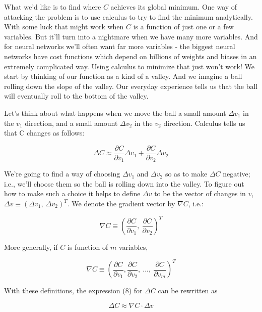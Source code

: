 \documentclass[12 pt]{article}
\begin{document}
What we'd like is to find where $ C $ achieves its global minimum. One
way of attacking the problem is to use calculus to try to find the
minimum analytically. With some luck that might work when $ C $ is a
function of just one or a few variables. But it'll turn into a nightmare
when we have many more variables. And for neural networks we'll often
want far more variables - the biggest neural networks have cost
functions which depend on billions of weights and biases in an extremely
complicated way. Using calculus to minimize that just won't work! We
start by thinking of our function as a kind of a valley. And we imagine
a ball rolling down the slope of the valley. Our everyday experience
tells us that the ball will eventually roll to the bottom of the valley.

Let's think about what happens when we move the ball a small amount
$ \Delta v_1 $ in the $ v_1 $ direction, and a small amount
$ \Delta v_2 $ in the $ v_2 $ direction. Calculus tells us that C
changes as follows:

\begin{equation}
    \Delta C \approx \frac {\partial C}{\partial v_1} \Delta v_1 +
    \frac{\partial C}{\partial v_2} \Delta v_2
\end{equation}

We're going to find a way of choosing $ \Delta v_1 $ and $
\Delta v_2 $ so as to make $ \Delta C $ negative; i.e., we'll choose
them so the ball is rolling down into the valley. To figure out how to
make such a choice it helps to define $ \Delta v $ to be the vector of
changes in $ v $, $ \Delta v \equiv (\Delta v_1, \ \Delta v_2)^T $.
We denote the gradient vector by $ \nabla C $, i.e.:

\begin{equation}
    \nabla C \equiv \left( \frac{\partial C}{\partial v_1}, \ \frac{\partial C}
    {\partial v_2} \right)^T
\end{equation}

More generally, if $ C $ is function of $ m $ variables,

\begin{equation}
    \nabla C \equiv \left( \frac{\partial C}{\partial v_1},
    \frac{\partial C}{\partial v_2}, \ ..., \ \frac{\partial C}
    {\partial v_m} \right)^T
\end{equation}

With these definitions, the expression (8) for $ \Delta C $ can be
rewritten as

\begin{equation}
    \Delta C \approx \nabla C ⋅ \Delta v
\end{equation}
\end{document}
